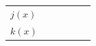 {{\begin{center}
\begin{tabular}[t]{|l|l|l|l|l|l|}
                  $j\left(x\right)$
                 &
         &
         &
         &
         &
     \tabularnewline\cline{1-1}\cline{2-2}\cline{3-3}\cline{4-4}\cline{5-5}\cline{6-6}
                  $k\left(x\right)$
                 &
         &
         &
         &
         &

\end{tabular}
\end{center}}}
